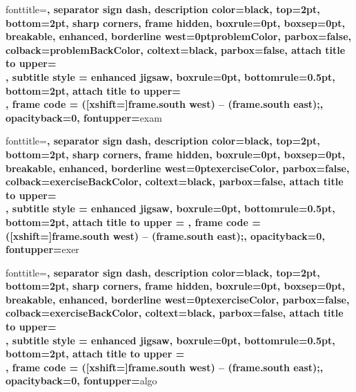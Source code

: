 %
     {fonttitle=\sffamily\bfseries\color{black},
      separator sign dash, description color=black,
      top=2pt, bottom=2pt,
      sharp corners,
      frame hidden, boxrule=0pt, boxsep=0pt, breakable,
      enhanced, borderline west={\the\tcbBorderWidth}{0pt}{problemColor},
      parbox=false,
      colback=problemBackColor,
      coltext=black,
      parbox=false,
      attach title to upper={\\},
      subtitle style = {enhanced jigsaw, boxrule=0pt, bottomrule=0.5pt, bottom=2pt,
      attach title to upper={\\},
      frame code = { ([xshift=\the\tcbBorderWidth]frame.south west) -- (frame.south east);}, 
      opacityback=0, fontupper=\color{black}}}{exam}
    {\begin{tcbproblem}{#1}{#2}}{\end{tcbproblem}}
%
    {fonttitle=\sffamily\bfseries\color{black},
        separator sign dash, description color=black,
        top=2pt, bottom=2pt,
        sharp corners,
        frame hidden, boxrule=0pt, boxsep=0pt, breakable,
        enhanced, borderline west={\the\tcbBorderWidth}{0pt}{exerciseColor},
        parbox=false,
        colback=exerciseBackColor,
        coltext=black,
        parbox=false,
        attach title to upper={\\},
        subtitle style = {enhanced jigsaw, boxrule=0pt, bottomrule=0.5pt, bottom=2pt,
        attach title to upper = {},
        frame code = { ([xshift=\the\tcbBorderWidth]frame.south west) -- (frame.south east);},
opacityback=0, fontupper=\color{black}}}{exer}
    {\begin{tcbexercise}{#1}{#2}}{\end{tcbexercise}}

    {fonttitle=\sffamily\bfseries\color{black},
        separator sign dash, description color=black,
        top=2pt, bottom=2pt,
        sharp corners,
        frame hidden, boxrule=0pt, boxsep=0pt, breakable,
        enhanced, borderline west={\the\tcbBorderWidth}{0pt}{exerciseColor},
        parbox=false,
        colback=exerciseBackColor,
        coltext=black,
        parbox=false,
        attach title to upper={\\},
        subtitle style = {enhanced jigsaw, boxrule=0pt, bottomrule=0.5pt, bottom=2pt,
        attach title to upper = {\\},
        frame code = { ([xshift=\the\tcbBorderWidth]frame.south west) -- (frame.south east);},
opacityback=0, fontupper=\color{black}}}{algo}
{\begin{tcbalgo}{#1}{#2}}{\end{tcbalgo}}
{\begin{tcbalgo*}{#1}{#2}}{\end{tcbalgo*}}




